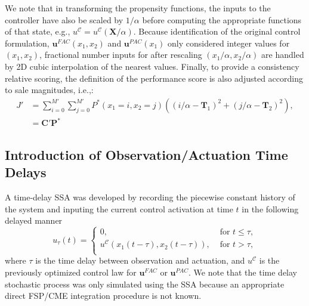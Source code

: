 \documentclass[12pt]{article}
\begin{document}
We note that in transforming the propensity functions, the inputs to the controller have also be scaled by $1/\alpha$ before computing the appropriate functions of that state, e.g., ${u}^{\mathcal{C}} = {u}^{\mathcal{C}}(\mathbf{X}/\alpha)$. Because identification of the original control formulation, $\mathbf{u}^{FAC}(x_1,x_2)$ and $\mathbf{u}^{PAC}(x_1)$ only considered integer values for $(x_1,x_2)$, fractional number inputs for after rescaling $(x_1/\alpha,x_2/\alpha)$ are handled by 2D cubic interpolation of the nearest values.
Finally, to provide a consistency relative scoring, the definition of the performance score is also adjusted according to sale magnitudes, i.e.,:
{\begin{align}
J' &= \sum_{i=0}^{M'}  \sum_{j=0}^{M'}P^*(x_1=i,x_2=j) ((i/\alpha - \mathbf T_1)^2 + (j/\alpha -\mathbf T_2)^2),\nonumber \\
& =\mathbf{C}'\mathbf{P}^*
\label{EuclidV}
\end{align}}

\subsection{Introduction of Observation/Actuation Time Delays}
A time-delay SSA was developed by recording the piecewise constant history of the system and inputing the current control activation at time $t$ in the following delayed manner
\begin{equation}
u_{\tau}(t)=\left\{
\begin{array}{rl}
      0 ,&\text{ for }  t \leq \tau, \\
      {u}^{\mathcal{C}}(x_1(t-\tau), x_2(t-\tau)) , &\text{ for }   t > \tau,\\
\end{array}\right. 
\label{scoreeq}
\end{equation}
where $\tau$ is the time delay between observation and actuation, and ${u}^{\mathcal{C}}$ is the previously optimized control law for $\mathbf{u}^{FAC}$ or $\mathbf{u}^{PAC}$. We note that the time delay stochastic process was only simulated using the SSA because an appropriate direct FSP/CME integration procedure is not known.
\end{document}
